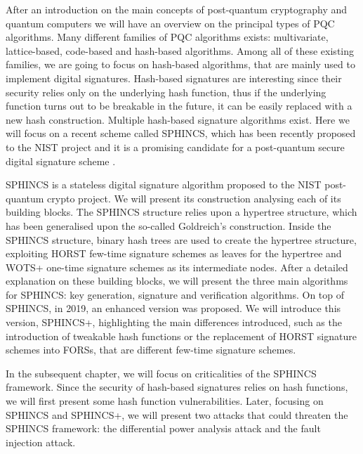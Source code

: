 \documentclass[a4paper,12pt]{article}
\begin{document}
After an introduction on the main concepts of post-quantum cryptography and quantum computers we will have an overview on the principal types of PQC algorithms. Many different families of PQC algorithms exists: multivariate, lattice-based, code-based and hash-based algorithms.
Among all of these existing families, we are going to focus on hash-based algorithms, that are mainly used to implement digital signatures. Hash-based signatures are interesting since their security relies only on the underlying hash function, thus if the underlying function turns out to be breakable in the future, it can be easily replaced with a new hash construction.
Multiple hash-based signature algorithms exist. Here we will focus on a recent scheme called SPHINCS, which has been recently proposed to the NIST project and it is a promising candidate for a post-quantum secure digital signature scheme \cite{4_wings}.

SPHINCS is a stateless digital signature algorithm proposed to the NIST post-quantum crypto project. We will present its construction analysing each of its building blocks. The SPHINCS structure relies upon a hypertree structure, which has been generalised upon the so-called Goldreich's construction. Inside the SPHINCS structure, binary hash trees are used to create the hypertree structure, exploiting HORST few-time signature schemes as leaves for the hypertree and WOTS+ one-time signature schemes as its intermediate nodes. After a detailed explanation on these building blocks, we will present the three main algorithms for SPHINCS: key generation, signature and verification algorithms.
On top of SPHINCS, in 2019, an enhanced version was proposed. We will introduce this version, SPHINCS+, highlighting the main differences introduced, such as the introduction of tweakable hash functions or the replacement of HORST signature schemes into FORSs, that are different few-time signature schemes.

In the subsequent chapter, we will focus on criticalities of the SPHINCS framework. Since the security of hash-based signatures relies on hash functions, we will first present some hash function vulnerabilities. Later, focusing on SPHINCS and SPHINCS+, we will present two attacks that could threaten the SPHINCS framework: the differential power analysis attack and the fault injection attack.
\end{document}

